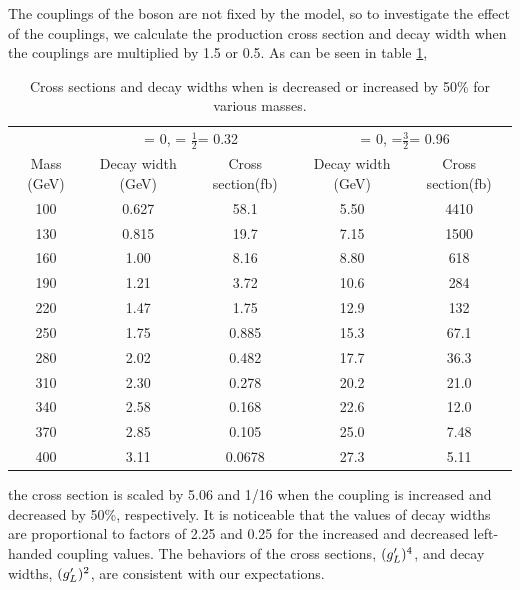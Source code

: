 The couplings of the \wprime boson are not fixed by the model, so to investigate the effect of the couplings, we calculate the production cross section and decay width when the couplings are multiplied by 1.5 or 0.5. As can be seen in table \ref{tab:XsecgLVar}, 
\begin{table}[htb]
	\centering
	\caption{Cross sections and decay widths when \gL is decreased or increased by 50\% for various \wprime masses. \label{tab:XsecgLVar} }
	\begin{tabular}{|c|c|c|c|c|}
		\hline 
	    & \multicolumn{2}{c|}{\gR = 0, \gL = $\frac{1}{2}$\gSM = 0.32}
		& \multicolumn{2}{c|}{\gR = 0, \gL =$\frac{3}{2}$\gSM = 0.96}\\\cline{2-5}
		\wprime Mass (GeV)  &  Decay width (GeV) &  Cross section(fb)&  Decay width (GeV) &  Cross section(fb)\\
		\hline 
		100& 0.627 & 58.1  & 5.50 & 4410\\
		130& 0.815 & 19.7  & 7.15 & 1500\\
		160& 1.00  & 8.16  & 8.80 & 618\\
		190& 1.21  & 3.72  & 10.6 & 284\\
		220& 1.47  & 1.75  & 12.9 & 132\\
		250& 1.75  & 0.885 & 15.3 & 67.1\\
		280& 2.02  & 0.482 & 17.7 & 36.3\\
		310& 2.30  & 0.278 & 20.2 & 21.0\\
		340& 2.58  & 0.168 & 22.6 & 12.0\\
		370& 2.85  & 0.105 & 25.0 & 7.48\\
		400& 3.11  & 0.0678& 27.3 & 5.11\\    
		\hline
	\end{tabular}
\end{table}  
the cross section is scaled by 5.06 and 1/16 when the coupling is increased and decreased by 50\%, respectively. It is noticeable that the values of decay widths are proportional to  factors of 2.25 and  0.25 for the increased  and decreased left-handed coupling values. The behaviors of the cross sections, $(g^\prime_L)^4$, and decay widths, $(g^\prime_L)^2$, are consistent with our expectations.



